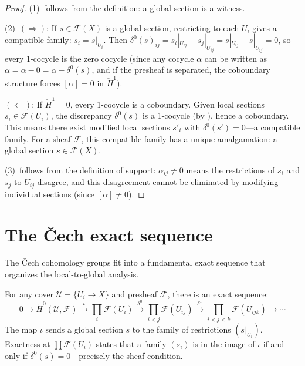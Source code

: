 \begin{proof}
(1)~follows from the definition: a global section is a witness.

(2)~$(\Rightarrow)$: If $s \in \mathcal{F}(X)$ is a global section,
restricting to each $U_i$ gives a compatible family:
$s_i = s|_{U_i}$.  Then $\delta^0(s)_{ij} = s_i|_{U_{ij}} - s_j|_{U_{ij}}
= s|_{U_{ij}} - s|_{U_{ij}} = 0$, so every 1-cocycle is the zero
cocycle (since any cocycle $\alpha$ can be written as $\alpha = \alpha - 0
= \alpha - \delta^0(s)$, and if the presheaf is separated, the coboundary
structure forces $[\alpha] = 0$ in $\check{H}^1$).

$(\Leftarrow)$: If $\check{H}^1 = 0$, every 1-cocycle is a coboundary.
Given local sections $s_i \in \mathcal{F}(U_i)$, the discrepancy
$\delta^0(s)$ is a 1-cocycle (by ),
hence a coboundary.  This means there exist modified local sections
$s'_i$ with $\delta^0(s') = 0$---a compatible family.  For a sheaf
$\mathcal{F}$, this compatible family has a unique amalgamation:
a global section $s \in \mathcal{F}(X)$.

(3)~follows from the definition of support: $\alpha_{ij} \neq 0$
means the restrictions of $s_i$ and $s_j$ to $U_{ij}$ disagree, and
this disagreement cannot be eliminated by modifying individual sections
(since $[\alpha] \neq 0$).
\end{proof}



\section{The \v{C}ech exact sequence}
\label{sec:cech:exact}

The \v{C}ech cohomology groups fit into a fundamental exact sequence
that organizes the local-to-global analysis.

\begin{proposition}
\label{prop:cech-exact}
For any cover $\mathcal{U} = \{U_i \to X\}$ and presheaf $\mathcal{F}$,
there is an exact sequence:
\[
  0 \to \check{H}^0(\mathcal{U}, \mathcal{F})
  \xrightarrow{\;\iota\;}
  \prod_{i} \mathcal{F}(U_i)
  \xrightarrow{\;\delta^0\;}
  \prod_{i<j} \mathcal{F}(U_{ij})
  \xrightarrow{\;\delta^1\;}
  \prod_{i<j<k} \mathcal{F}(U_{ijk})
  \to \cdots
\]
The map $\iota$ sends a global section $s$ to the family of
restrictions $(s|_{U_i})$.  Exactness at $\prod \mathcal{F}(U_i)$
states that a family $(s_i)$ is in the image of $\iota$ if and only if
$\delta^0(s) = 0$---precisely the sheaf condition.
\end{proposition}


